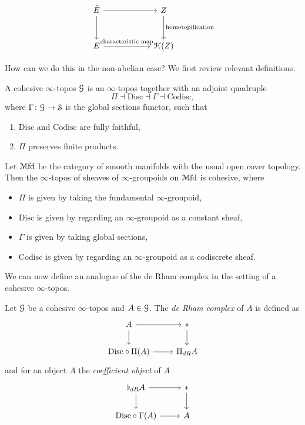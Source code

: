 \documentclass[10pt]{amsart}
\begin{document}
\[
\begin{tikzcd}[row sep=1cm, column sep=2cm]
 \hat{E} \arrow[r] \arrow[d] & Z \arrow[d, "\text{homotopification}"] \\ 
	E \arrow[r, "\text{characteristic map}"] & \lH(Z)
\end{tikzcd} 
\]

How can we do this in the non-abelian case? We first review relevant definitions.

\begin{definition}
 A cohesive	$\infty$-topos $\mathcal{G}$ is an $\infty$-topos together with an adjoint quadruple
	\[	\Pi \dashv \mathrm{Disc} \dashv \Gamma \dashv \mathrm{Codisc},	\]
	where $\Gamma\colon \mathcal{G} \to \mathcal{S}$ is the global sections functor,	such that
	\begin{enumerate}
		\item $\mathrm{Disc}$ and $\mathrm{Codisc}$ are fully faithful,
		\item $\Pi$ preserves finite products.
	\end{enumerate}
\end{definition}

\begin{example}
	Let $\mathcal{M}\mathrm{fd}$ be the category of smooth manifolds with the usual open cover topology. Then the $\infty$-topos of sheaves of $\infty$-groupoids on $\mathcal{M}\mathrm{fd}$ is cohesive, where
	\begin{itemize}
		\item $\Pi$ is given by taking the fundamental $\infty$-groupoid,
		\item $\mathrm{Disc}$ is given by regarding an $\infty$-groupoid as a constant sheaf,
		\item $\Gamma$ is given by taking global sections,
		\item $\mathrm{Codisc}$ is given by regarding an $\infty$-groupoid as a codiscrete sheaf.
	\end{itemize}
\end{example}

We can now define an analogue of the de Rham complex in the setting of a cohesive $\infty$-topos.

\begin{definition}
	Let $\mathcal{G}$ be a cohesive $\infty$-topos and $A	\in \mathcal{G}$. The \emph{de Rham complex} of $A$ is defined as
	\[
	\begin{tikzcd}
	 A \arrow[d] \arrow[r] & * \arrow[d] \\
		\mathrm{Disc} \circ \Pi(A) \arrow[r] &  \Pi_{dR}A
	\end{tikzcd}	
	\]
	and for an object $A$ the \emph{coefficient object} of $A$
	\[
	\begin{tikzcd}
		\flat_{dR}A \arrow[d] \arrow[r]	& * \arrow[d] \\
		\mathrm{Disc} \circ \Gamma(A) \arrow[r] & A 
	\end{tikzcd}
	\]
\end{definition}
\end{document}
